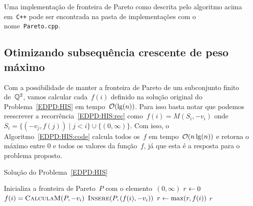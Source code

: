 Uma implementação de fronteira de Pareto como descrita pelo algoritmo acima em~\texttt{C++} pode ser encontrada na pasta de implementações com o nome~\texttt{Pareto.cpp}.



\subsection{Otimizando subsequência crescente de peso máximo}

Com a possibilidade de manter a fronteira de Pareto de um subconjunto finito de~$\mathbb{Q}^2$, vamos calcular cada~$f(i)$ definido na solução original do Problema~\ref{EDPD:HIS} em tempo~$\mathcal{O}(\lg(n))$. Para isso basta notar que podemos reescrever a recorrência~\ref{EDPD:HIS:rec} como~$f(i) = M(S_i,-v_i)$ onde~$S_i = \{(-v_j,f(j)) \mid j < i\} \cup \{(0,\infty)\}$. Com isso, o Algoritmo~\ref{EDPD:HIS:code} calcula todos os~$f$ em tempo~$\mathcal{O}(n\lg(n))$ e retorna o máximo entre 0 e todos os valores da função~$f$, já que esta é a resposta para o problema proposto.

\begin{algorithm}[h]
\caption{Solução do Problema~\ref{EDPD:HIS}}
\label{EDPD:HIS:code}
\begin{algorithmic}[1]
    \State Inicializa a fronteira de Pareto~$P$ com o elemento~$(0,\infty)$
    \State $r \leftarrow 0$
        \State $f(i) = \textsc{CalculaM}(P,-v_i)$
        \State $\textsc{Insere}(P,(f(i),-v_i))$
        \State $r \leftarrow \max(r,f(i))$
    \EndFor
    \State \Return $r$
\EndFunction
\end{algorithmic}
\end{algorithm}
